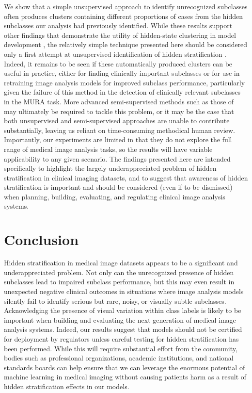 \documentclass[sigconf,anonymous,review]{acmart}
\begin{document}
We show that a simple unsupervised approach to identify unrecognized subclasses often produces clusters containing different proportions of cases from the hidden subclasses our analysis had previously identified. 
While these results support other findings that demonstrate the utility of hidden-state clustering in model development \citep{Liu2019-qt}, the relatively simple technique presented here should be considered only a first attempt at unsupervised identification of hidden stratification \citep{calinski1974dendrite, rousseeuw1987silhouettes}. 
Indeed, it remains to be seen if these automatically produced clusters can be useful in practice, either for finding clinically important subclasses or for use in retraining image analysis models for improved subclass performance, particularly given the failure of this method in the detection of clinically relevant subclasses in the MURA task. 
More advanced semi-supervised methods such as those of \citep{chen2019slicing} may ultimately be required to tackle this problem, or it may be the case that both unsupervised and semi-supervised approaches are unable to contribute substantially, leaving us reliant on time-consuming methodical human review.
Importantly, our experiments are limited in that they do not explore the full range of medical image analysis tasks, so the results will have variable applicability to any given scenario.
The findings presented here are intended specifically to highlight the largely underappreciated problem of hidden stratification in clinical imaging datasets, and to suggest that awareness of hidden stratification is important and should be considered (even if to be dismissed) when planning, building, evaluating, and regulating clinical image analysis systems.
 
\section{Conclusion}

Hidden stratification in medical image datasets appears to be a significant and underappreciated problem. 
Not only can the unrecognized presence of hidden subclasses lead to impaired subclass performance, but this may even result in unexpected negative clinical outcomes in situations where image analysis models silently fail to identify serious but rare, noisy, or visually subtle subclasses.
Acknowledging the presence of visual variation within class labels is likely to be important when building and evaluating the next generation of medical image analysis systems.
Indeed, our results suggest that models should not be certified for deployment by regulators unless careful testing for hidden stratification has been performed.
While this will require substantial effort from the community, bodies such as professional organizations, academic institutions, and national standards boards can help ensure that we can leverage the enormous potential of machine learning in medical imaging without causing patients harm as a result of hidden stratification effects in our models.
\end{document}
